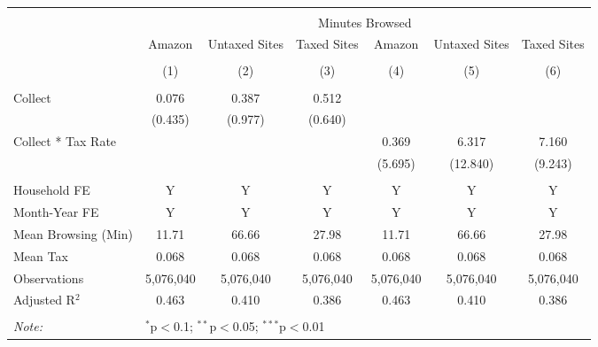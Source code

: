 
\begin{table}[!htbp] \centering 
  \caption{} 
  \label{} 
\begin{tabular}{@{\extracolsep{5pt}}lcccccc} 
\\[-1.8ex]\hline 
\hline \\[-1.8ex] 
 & \multicolumn{6}{c}{Minutes Browsed} \\ 
\cline{2-7} 
 & Amazon & Untaxed Sites & Taxed Sites & Amazon & Untaxed Sites & Taxed Sites \\ 
\\[-1.8ex] & (1) & (2) & (3) & (4) & (5) & (6)\\ 
\hline \\[-1.8ex] 
 Collect & 0.076 & 0.387 & 0.512 &  &  &  \\ 
  & (0.435) & (0.977) & (0.640) &  &  &  \\ 
  Collect * Tax Rate &  &  &  & 0.369 & 6.317 & 7.160 \\ 
  &  &  &  & (5.695) & (12.840) & (9.243) \\ 
 \hline \\[-1.8ex] 
Household FE & Y & Y & Y & Y & Y & Y \\ 
Month-Year FE & Y & Y & Y & Y & Y & Y \\ 
Mean Browsing (Min) & 11.71 & 66.66 & 27.98 & 11.71 & 66.66 & 27.98 \\ 
Mean Tax & 0.068 & 0.068 & 0.068 & 0.068 & 0.068 & 0.068 \\ 
Observations & 5,076,040 & 5,076,040 & 5,076,040 & 5,076,040 & 5,076,040 & 5,076,040 \\ 
Adjusted R$^{2}$ & 0.463 & 0.410 & 0.386 & 0.463 & 0.410 & 0.386 \\ 
\hline 
\hline \\[-1.8ex] 
\textit{Note:}  & \multicolumn{6}{l}{$^{*}$p$<$0.1; $^{**}$p$<$0.05; $^{***}$p$<$0.01} \\ 
\end{tabular} 
\end{table} 
